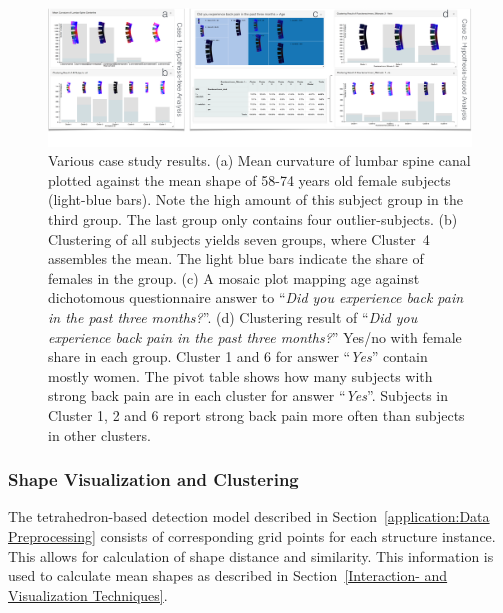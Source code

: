 \documentclass[journal]{style/vgtc} 			          %
\begin{document}
\begin{figure}[htb]
 \centering
 \includegraphics[width=1\textwidth, resolution=300]{figures/evaluation}
 \caption{Various case study results.
 (a) Mean curvature of lumbar spine canal plotted against the mean shape of 58-74 years old female subjects (light-blue bars).
 Note the high amount of this subject group in the third group. The last group only contains four outlier-subjects.
 (b) Clustering of all subjects yields seven groups, where Cluster~4 assembles the mean. The light blue bars indicate the share of females in the group.
 (c) A mosaic plot mapping age against dichotomous questionnaire answer to ``\emph{Did you experience back pain in the past three months?}''.
 (d) Clustering result of ``\emph{Did you experience back pain in the past three months?}'' Yes/no with female share in each group. 
 Cluster 1 and 6 for answer ``\emph{Yes}'' contain mostly women.
 The pivot table shows how many subjects with strong back pain are in each cluster for answer ``\emph{Yes}''.
 Subjects in Cluster 1, 2 and 6 report strong back pain more often than subjects in other clusters.
 }
 \label{fig:application}
\end{figure}
\subsubsection{Shape Visualization and Clustering}
%
The tetrahedron-based detection model described in Section~\ref{application:Data Preprocessing} consists of corresponding grid points for each structure instance.
%
This allows for calculation of shape distance and similarity.
%
This information is used to calculate mean shapes as described in Section~\ref{Interaction- and Visualization Techniques}.
\end{document}

